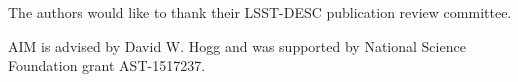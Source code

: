 \documentclass[\docopts]{\docclass}
\begin{document}

The authors would like to thank their LSST-DESC publication review committee.

AIM is advised by David W. Hogg and was supported by National Science Foundation grant AST-1517237.



%
%






\end{document}
